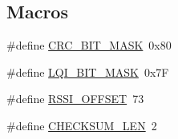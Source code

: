 \subsection*{Macros}
\begin{DoxyCompactItemize}
\item 
\#define \hyperlink{boards_2_open_mote-_c_c2538_2radio_8c_a1008df9f33255a79dd0dbda513b7c17f}{C\+R\+C\+\_\+\+B\+I\+T\+\_\+\+M\+A\+SK}~0x80
\item 
\#define \hyperlink{boards_2_open_mote-_c_c2538_2radio_8c_aaecc1d0d0e4f9f8ac5bb039e1963bf3a}{L\+Q\+I\+\_\+\+B\+I\+T\+\_\+\+M\+A\+SK}~0x7F
\item 
\#define \hyperlink{boards_2_open_mote-_c_c2538_2radio_8c_a2749202671e6c83693acbddba7257782}{R\+S\+S\+I\+\_\+\+O\+F\+F\+S\+ET}~73
\item 
\#define \hyperlink{boards_2_open_mote-_c_c2538_2radio_8c_ab6be81f71187bcf7aada9dd5f362c0ea}{C\+H\+E\+C\+K\+S\+U\+M\+\_\+\+L\+EN}~2
\end{DoxyCompactItemize}
